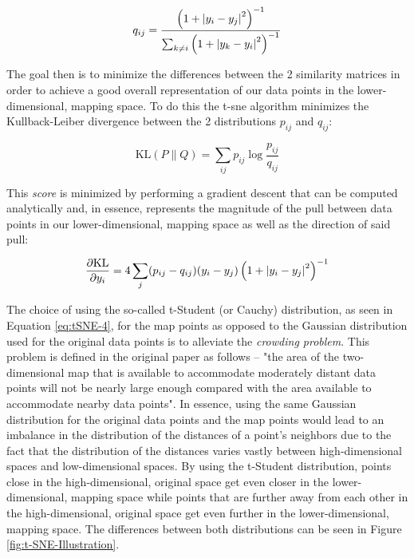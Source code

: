 \begin{equation}
    q_{ij} = \frac{\left(1 + \left\lvert y_i - y_j\right\rvert^2\right)^{-1}}{\sum_{k \neq i}\left(1 + \left\lvert y_k - y_i\right\rvert^2\right)^{-1}}
\label{eq:tSNE-4}
\end{equation}

\noindent \newline The goal then is to minimize the differences between the 2 similarity matrices in order to achieve a good overall representation of our data points in the lower-dimensional, mapping space. To do this the \gls{t-sne} algorithm minimizes the Kullback-Leiber divergence between the 2 distributions $p_{ij}$ and $q_{ij}$:

\begin{equation}
    \text{KL}(P\|Q) = \sum_{ij} p_{ij} \log \frac{p_{ij}}{q_{ij}}
\label{eq:tSNE-5}
\end{equation}

\noindent \newline This \textit{score} is minimized by performing a gradient descent that can be computed analytically and, in essence, represents the magnitude of the pull between data points in our lower-dimensional, mapping space as well as the direction of said pull:

\begin{equation}
    \frac{\partial \text{KL}}{\partial y_i} = 4 \sum_j (p_{ij} - q_{ij})(y_i - y_j)\left(1 + \left\lvert y_i - y_j\right\rvert^2\right)^{-1}
\label{eq:tSNE-6}
\end{equation}

\noindent \newline The choice of using the so-called t-Student (or Cauchy) distribution, as seen in Equation \ref{eq:tSNE-4}, for the map points as opposed to the Gaussian distribution used for the original data points is to alleviate the \textit{crowding problem}. This problem is defined in the original paper as follows -- "the area of the two-dimensional map that is available to accommodate moderately distant data points will not be nearly large enough compared with the area available to accommodate nearby data points". In essence, using the same Gaussian distribution for the original data points and the map points would lead to an imbalance in the distribution of the distances of a point's neighbors due to the fact that the distribution of the distances varies vastly between high-dimensional spaces and low-dimensional spaces. By using the t-Student distribution, points close in the high-dimensional, original space get even closer in the lower-dimensional, mapping space while points that are further away from each other in the high-dimensional, original space get even further in the lower-dimensional, mapping space. The differences between both distributions can be seen in Figure \ref{fig:t-SNE-Illustration}.


